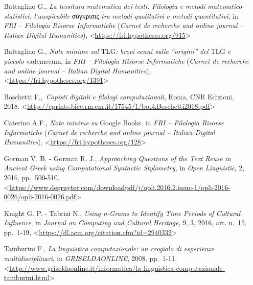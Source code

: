 \documentclass[
  b5paper,
  twoside,
  12pt,
  chapterprefix=false,
  bibliography=totocnumbered,
  parskip=false]{scrbook}
\begin{document}
Battaglino G., \emph{La tessitura matematica dei testi. Filologia e metodi
matematico-statistici: l'auspicabile} σύγκρισις \emph{tra metodi qualitativi
e metodi quantitativi}, in \emph{FRI -- Filologia Risorse Informatiche}
(\emph{Carnet de recherche and online journal -- Italian Digital
Humanities}),
\textless{}\href{https://fri.hypotheses.org/915}{{https://fri.hypotheses.org/915}}\textgreater{}

Battaglino G., \emph{Note minime sul} TLG\emph{: brevi cenni sulle \enquote{origini} del}
TLG \emph{e piccolo} vademecum, in \emph{FRI -- Filologia Risorse Informatiche}
(\emph{Carnet de recherche and online journal -- Italian Digital
Humanities}),
\textless{}\href{https://fri.hypotheses.org/1391}{{https://fri.hypotheses.org/1391}}\textgreater{}

Boschetti F.,~\emph{Copisti digitali e filologi computazionali}, Roma, CNR
Edizioni, 2018,
\textless{}\href{http://eprints.bice.rm.cnr.it/17545/1/bookBoschetti2018.pdf}{{http://eprints.bice.rm.cnr.it/17545/1/bookBoschetti2018.pdf}}\textgreater{}

Caterino A.F., \emph{Note minime su} Google Books, in \emph{FRI -- Filologia
Risorse Informatiche} (\emph{Carnet de recherche and online journal --
Italian Digital Humanities}),
\textless{}\href{https://fri.hypotheses.org/128}{{https://fri.hypotheses.org/128}}\textgreater{}

Gorman V. B. - Gorman R. J., \emph{Approaching Questions of the Text Reuse in
Ancient Greek using Computational Syntactic Stylometry}, in \emph{Open
Linguistic}, 2, 2016, pp.~500-510,
\textless{}\href{https://www.degruyter.com/downloadpdf/j/opli.2016.2.issue-1/opli-2016-0026/opli-2016-0026.pdf}{{https://www.degruyter.com/downloadpdf/j/opli.2016.2.issue-1/opli-2016-0026/opli-2016-0026.pdf}}\textgreater{}

Knight G. P. - Tabrizi N., \emph{Using n-Grams to Identify Time Periods of
Cultural Influence}, in \emph{Journal on Computing and Cultural Heritage}, 9,
3, 2016, art. n.~15, pp.~1-19,
\textless{}\href{https://dl.acm.org/citation.cfm?id=2940332}{{https://dl.acm.org/citation.cfm?id=2940332}}\textgreater{}

Tamburini F., \emph{La linguistica computazionale: un crogiolo di esperienze
multidisciplinari}, in \emph{GRISELDAONLINE}, 2008, pp.~1-11,
\textless{}\href{http://www.griseldaonline.it/informatica/la-linguistica-computazionale-tamburini.html}{{http://www.griseldaonline.it/informatica/la-linguistica-computazionale-tamburini.html}}\textgreater{}
\end{document}
